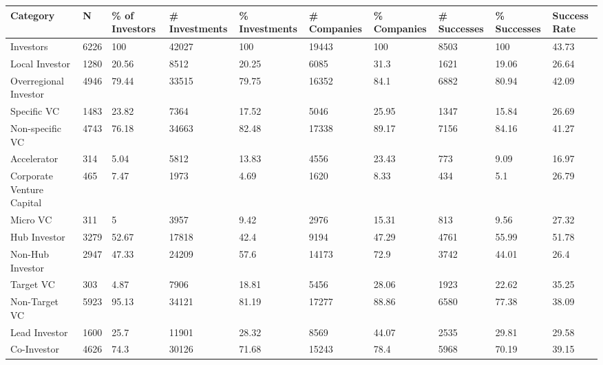 \begin{tabular}{llllllllll}
  \toprule
Category & N & \% of Investors & # Investments & \% Investments & # Companies & \% Companies & # Successes & \% Successes & Success Rate \\ 
  \midrule
Investors & 6226 & 100 & 42027 & 100 & 19443 & 100 & 8503 & 100 & 43.73 \\ 
  Local Investor & 1280 & 20.56 & 8512 & 20.25 & 6085 & 31.3 & 1621 & 19.06 & 26.64 \\ 
  Overregional Investor & 4946 & 79.44 & 33515 & 79.75 & 16352 & 84.1 & 6882 & 80.94 & 42.09 \\ 
  Specific VC & 1483 & 23.82 & 7364 & 17.52 & 5046 & 25.95 & 1347 & 15.84 & 26.69 \\ 
  Non-specific VC & 4743 & 76.18 & 34663 & 82.48 & 17338 & 89.17 & 7156 & 84.16 & 41.27 \\ 
  Accelerator & 314 & 5.04 & 5812 & 13.83 & 4556 & 23.43 & 773 & 9.09 & 16.97 \\ 
  Corporate Venture Capital & 465 & 7.47 & 1973 & 4.69 & 1620 & 8.33 & 434 & 5.1 & 26.79 \\ 
  Micro VC & 311 & 5 & 3957 & 9.42 & 2976 & 15.31 & 813 & 9.56 & 27.32 \\ 
  Hub Investor & 3279 & 52.67 & 17818 & 42.4 & 9194 & 47.29 & 4761 & 55.99 & 51.78 \\ 
  Non-Hub Investor & 2947 & 47.33 & 24209 & 57.6 & 14173 & 72.9 & 3742 & 44.01 & 26.4 \\ 
  Target VC & 303 & 4.87 & 7906 & 18.81 & 5456 & 28.06 & 1923 & 22.62 & 35.25 \\ 
  Non-Target VC & 5923 & 95.13 & 34121 & 81.19 & 17277 & 88.86 & 6580 & 77.38 & 38.09 \\ 
  Lead Investor & 1600 & 25.7 & 11901 & 28.32 & 8569 & 44.07 & 2535 & 29.81 & 29.58 \\ 
  Co-Investor & 4626 & 74.3 & 30126 & 71.68 & 15243 & 78.4 & 5968 & 70.19 & 39.15 \\ 
   \bottomrule
\end{tabular}
